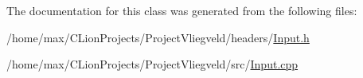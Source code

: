 The documentation for this class was generated from the following files\+:\begin{DoxyCompactItemize}
\item 
/home/max/\+C\+Lion\+Projects/\+Project\+Vliegveld/headers/\hyperlink{Input_8h}{Input.\+h}\item 
/home/max/\+C\+Lion\+Projects/\+Project\+Vliegveld/src/\hyperlink{Input_8cpp}{Input.\+cpp}\end{DoxyCompactItemize}
